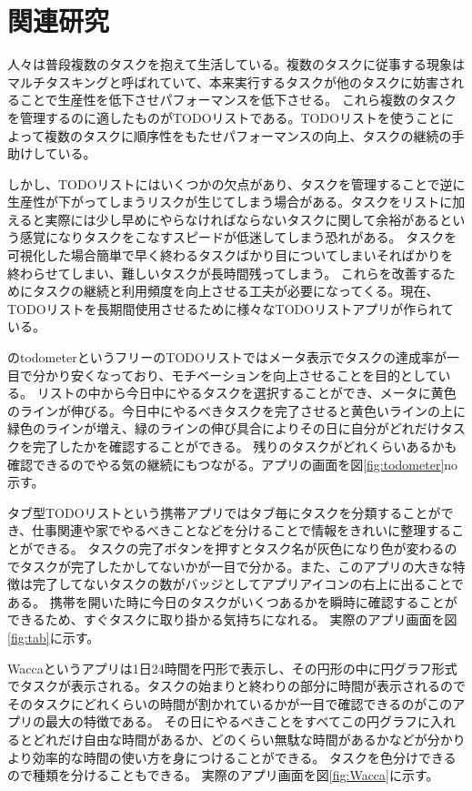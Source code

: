 \chapter{関連研究}
\label{cha:related}
人々は普段複数のタスクを抱えて生活している。複数のタスクに従事する現象はマルチタスキングと呼ばれていて、本来実行するタスクが他のタスクに妨害されることで生産性を低下させパフォーマンスを低下させる。
これら複数のタスクを管理するのに適したものがTODOリストである。TODOリストを使うことによって複数のタスクに順序性をもたせパフォーマンスの向上、タスクの継続の手助けしている。

しかし、TODOリストにはいくつかの欠点があり、タスクを管理することで逆に生産性が下がってしまうリスクが生じてしまう場合がある。タスクをリストに加えると実際には少し早めにやらなければならないタスクに関して余裕があるという感覚になりタスクをこなすスピードが低迷してしまう恐れがある。
タスクを可視化した場合簡単で早く終わるタスクばかり目についてしまいそればかりを終わらせてしまい、難しいタスクが長時間残ってしまう。
これらを改善するためにタスクの継続と利用頻度を向上させる工夫が必要になってくる。現在、TODOリストを長期間使用させるために様々なTODOリストアプリが作られている。

\cite{todometer}のtodometerというフリーのTODOリストではメータ表示でタスクの達成率が一目で分かり安くなっており、モチベーションを向上させることを目的としている。
リストの中から今日中にやるタスクを選択することができ、メータに黄色のラインが伸びる。今日中にやるべきタスクを完了させると黄色いラインの上に緑色のラインが増え、緑のラインの伸び具合によりその日に自分がどれだけタスクを完了したかを確認することができる。
残りのタスクがどれくらいあるかも確認できるのでやる気の継続にもつながる。アプリの画面を図\ref{fig:todometer}no示す。


タブ型TODOリスト\cite{tab}という携帯アプリではタブ毎にタスクを分類することができ、仕事関連や家でやるべきことなどを分けることで情報をきれいに整理することができる。
タスクの完了ボタンを押すとタスク名が灰色になり色が変わるのでタスクが完了したかしてないかが一目で分かる。また、このアプリの大きな特徴は完了してないタスクの数がバッジとしてアプリアイコンの右上に出ることである。
携帯を開いた時に今日のタスクがいくつあるかを瞬時に確認することができるため、すぐタスクに取り掛かる気持ちになれる。
実際のアプリ画面を図\ref{fig:tab}に示す。


Wacca\cite{Wacca}というアプリは1日24時間を円形で表示し、その円形の中に円グラフ形式でタスクが表示される。タスクの始まりと終わりの部分に時間が表示されるのでそのタスクにどれくらいの時間が割かれているかが一目で確認できるのがこのアプリの最大の特徴である。
その日にやるべきことをすべてこの円グラフに入れるとどれだけ自由な時間があるか、どのくらい無駄な時間があるかなどが分かりより効率的な時間の使い方を身につけることができる。
タスクを色分けできるので種類を分けることもできる。
実際のアプリ画面を図\ref{fig:Wacca}に示す。


